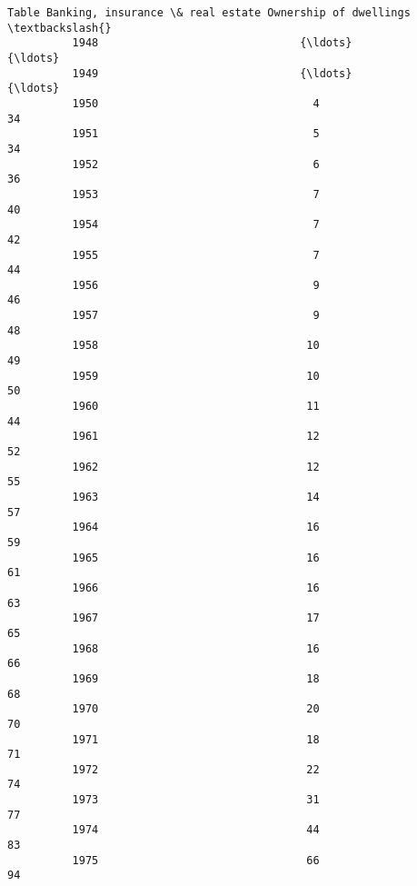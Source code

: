 \documentclass[11pt]{article}
\begin{document}
\begin{Verbatim}[commandchars=\\\{\}]
          Table Banking, insurance \& real estate Ownership of dwellings  \textbackslash{}
          1948                               {\ldots}                    {\ldots}   
          1949                               {\ldots}                    {\ldots}   
          1950                                 4                     34   
          1951                                 5                     34   
          1952                                 6                     36   
          1953                                 7                     40   
          1954                                 7                     42   
          1955                                 7                     44   
          1956                                 9                     46   
          1957                                 9                     48   
          1958                                10                     49   
          1959                                10                     50   
          1960                                11                     44   
          1961                                12                     52   
          1962                                12                     55   
          1963                                14                     57   
          1964                                16                     59   
          1965                                16                     61   
          1966                                16                     63   
          1967                                17                     65   
          1968                                16                     66   
          1969                                18                     68   
          1970                                20                     70   
          1971                                18                     71   
          1972                                22                     74   
          1973                                31                     77   
          1974                                44                     83   
          1975                                66                     94   
          

\end{Verbatim}
\end{document}
